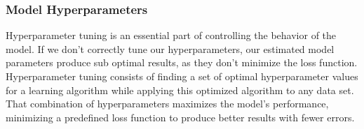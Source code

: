 \newpage
\subsubsection{Model Hyperparameters} 
Hyperparameter tuning is an essential part of controlling the behavior of the  model. If we don’t correctly tune our hyperparameters, our estimated model parameters produce sub optimal results, as they don’t minimize the loss function. \\

Hyperparameter tuning consists of finding a set of optimal hyperparameter values for a learning algorithm while applying this optimized algorithm to any data set. That combination of hyperparameters maximizes the model’s performance, minimizing a predefined loss function to produce better results with fewer errors.\\


